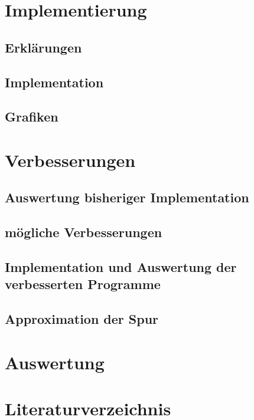 \documentclass[a4paper,12pt]{report}
\newcommand{\1}{\mathds{1}}
\theoremstyle{plain} %
\theoremstyle{definition} %
\theoremstyle{remark}
\begin{document}
\chapter{Implementierung}
\label{sec: Programmieren}
      \section{Erklärungen}

      \section{Implementation}

      \section{Grafiken}

\chapter{Verbesserungen}
\label{sec: Verbesserungen}
      \section{Auswertung bisheriger Implementation}

      \section{mögliche Verbesserungen}

      \section{Implementation und Auswertung der verbesserten Programme}

      \section{Approximation der Spur}

\chapter{Auswertung}
\label{sec: Auswertung}

\chapter{Literaturverzeichnis}
\end{document}
